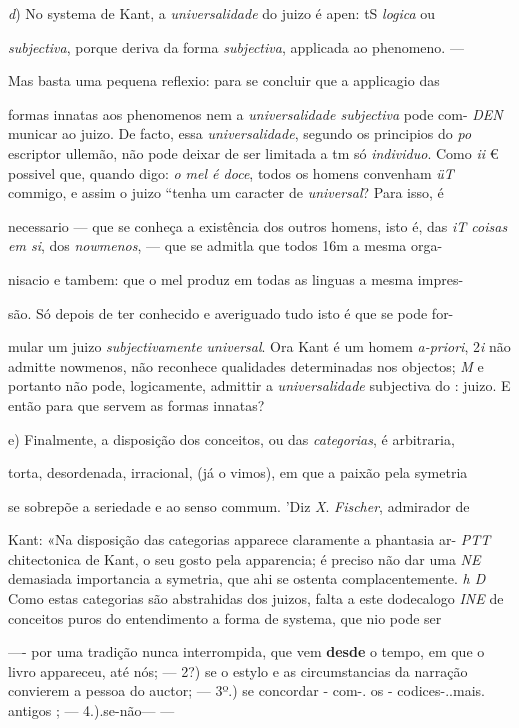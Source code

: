 \emph{d}) No systema de Kant, a \emph{universalidade} do juizo é apen: tS \emph{logica} ou

\emph{subjectiva}, porque deriva da forma \emph{subjectiva}, applicada ao phenomeno. ---

Mas basta uma pequena reflexio: para se concluir que a applicagio das

formas innatas aos phenomenos nem a \emph{universalidade subjectiva} pode com- \emph{DEN} municar ao juizo. De facto, essa \emph{universalidade}, segundo os principios do \emph{po} escriptor ullemão, não pode deixar de ser limitada a tm só \emph{individuo}. Como \emph{ii} € possivel que, quando digo: \emph{o mel é doce}, todos os homens convenham \emph{üT} commigo, e assim o juizo “tenha um caracter de \emph{universal}? Para isso, é

necessario --- que se conheça a existência dos outros homens, isto é, das \emph{iT coisas em si}, dos \emph{nowmenos}, --- que se admitla que todos 16m a mesma orga-

nisacio e tambem: que o mel produz em todas as linguas a mesma impres-

são. Só depois de ter conhecido e averiguado tudo isto é que se pode for-

mular um juizo \emph{subjectivamente universal}. Ora Kant é um homem \emph{a-priori}, 2\emph{i} não admitte nowmenos, não reconhece qualidades determinadas nos objectos; \emph{M} e portanto não pode, logicamente, admittir a \emph{universalidade} subjectiva do \textbar{}: juizo. E então para que servem as formas innatas?

e) Finalmente, a disposição dos conceitos, ou das \emph{categorias}, é arbitraria,

torta, desordenada, irracional, (já o vimos), em que a paixão pela symetria

se sobrepõe a seriedade e ao senso commum. 'Diz \emph{X}. \emph{Fischer}, admirador de

Kant: «Na disposição das categorias apparece claramente a phantasia ar- \emph{PTT} chitectonica de Kant, o seu gosto pela apparencia; é preciso não dar uma \emph{NE} demasiada importancia a symetria, que ahi se ostenta complacentemente. \emph{h D} Como estas categorias são abstrahidas dos juizos, falta a este dodecalogo \emph{INE} de conceitos puros do entendimento a forma de systema, que nio pode ser

----   por uma tradição nunca interrompida, que vem \textbf{desde} o tempo, em que o livro appareceu, até nós; --- 2?) se o estylo e as circumstancias da narração convierem a pessoa do auctor; --- 3º.) se concordar - com-. os - codices-..mais. antigos ; --- 4.).se-não--- ---

